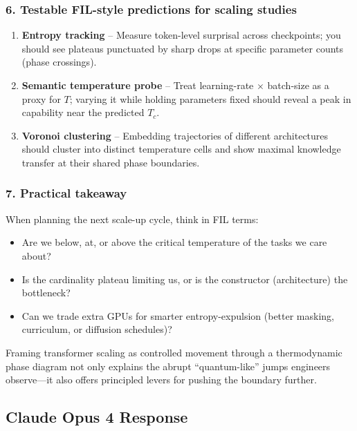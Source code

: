 \documentclass[11pt,letterpaper]{article}
\begin{document}
\subsubsection*{6. Testable FIL-style predictions for scaling studies}
\begin{enumerate}
    \item \textbf{Entropy tracking} – Measure token-level surprisal across checkpoints; you should see plateaus punctuated by sharp drops at specific parameter counts (phase crossings).
    \item \textbf{Semantic temperature probe} – Treat learning-rate $\times$ batch-size as a proxy for $T$; varying it while holding parameters fixed should reveal a peak in capability near the predicted $T_{c}$.
    \item \textbf{Voronoi clustering} – Embedding trajectories of different architectures should cluster into distinct temperature cells and show maximal knowledge transfer at their shared phase boundaries.
\end{enumerate}

\subsubsection*{7. Practical takeaway}
When planning the next scale-up cycle, think in FIL terms:
\begin{itemize}
    \item Are we below, at, or above the critical temperature of the tasks we care about?
    \item Is the cardinality plateau limiting us, or is the constructor (architecture) the bottleneck?
    \item Can we trade extra GPUs for smarter entropy-expulsion (better masking, curriculum, or diffusion schedules)?
\end{itemize}
Framing transformer scaling as controlled movement through a thermodynamic phase diagram not only explains the abrupt “quantum-like” jumps engineers observe—it also offers principled levers for pushing the boundary further.


\subsection{Claude Opus 4 Response}
\label{subsec:q1_claude}
\end{document}
